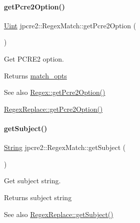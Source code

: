 \paragraph{\texorpdfstring{get\+Pcre2\+Option()}{getPcre2Option()}}
{\footnotesize\ttfamily \hyperlink{namespacejpcre2_a078242d38221a13fb3543b9edd78c099}{Uint} jpcre2\+::\+Regex\+Match\+::get\+Pcre2\+Option (\begin{DoxyParamCaption}{ }\end{DoxyParamCaption})\hspace{0.3cm}{\ttfamily [inline]}}



Get P\+C\+R\+E2 option. 

\begin{DoxyReturn}{Returns}
\hyperlink{classjpcre2_1_1RegexMatch_a697d5731007350b0f20d2018fcfafa90}{match\+\_\+opts} 
\end{DoxyReturn}
\begin{DoxySeeAlso}{See also}
\hyperlink{classjpcre2_1_1Regex_a857307fc59ba7f010b097e61c1744923_a857307fc59ba7f010b097e61c1744923}{Regex\+::get\+Pcre2\+Option()} 

\hyperlink{classjpcre2_1_1RegexReplace_ac9e158fa5dc0c4d8b27e2dd694e7bc84_ac9e158fa5dc0c4d8b27e2dd694e7bc84}{Regex\+Replace\+::get\+Pcre2\+Option()} 
\end{DoxySeeAlso}
\hypertarget{classjpcre2_1_1RegexMatch_a6ebe41305bcc7262bec814e9e737d056_a6ebe41305bcc7262bec814e9e737d056}{}\label{classjpcre2_1_1RegexMatch_a6ebe41305bcc7262bec814e9e737d056_a6ebe41305bcc7262bec814e9e737d056} 
\paragraph{\texorpdfstring{get\+Subject()}{getSubject()}}
{\footnotesize\ttfamily \hyperlink{namespacejpcre2_a91f03070152fb228bc116c5a737f1d16}{String} jpcre2\+::\+Regex\+Match\+::get\+Subject (\begin{DoxyParamCaption}{ }\end{DoxyParamCaption})\hspace{0.3cm}{\ttfamily [inline]}}



Get subject string. 

\begin{DoxyReturn}{Returns}
subject string 
\end{DoxyReturn}
\begin{DoxySeeAlso}{See also}
\hyperlink{classjpcre2_1_1RegexReplace_a747ec0bd529b8dd49d2db30c75786026_a747ec0bd529b8dd49d2db30c75786026}{Regex\+Replace\+::get\+Subject()} 
\end{DoxySeeAlso}
\hypertarget{classjpcre2_1_1RegexMatch_a3da6a2319cd577d7f2f10c66dcf59a99_a3da6a2319cd577d7f2f10c66dcf59a99}{}\label{classjpcre2_1_1RegexMatch_a3da6a2319cd577d7f2f10c66dcf59a99_a3da6a2319cd577d7f2f10c66dcf59a99} 
